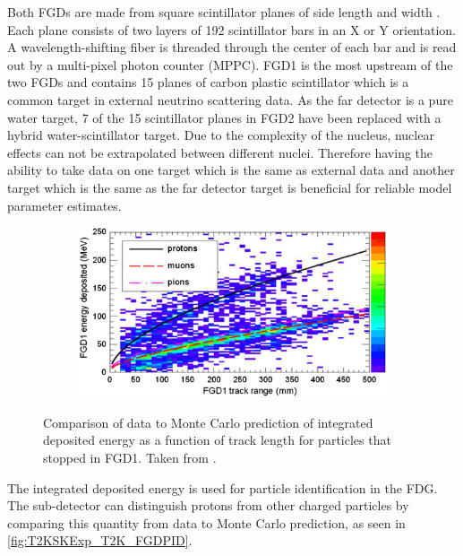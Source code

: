 Both FGDs are made from square scintillator planes of side length  and width . Each plane consists of two layers of 192 scintillator bars in an X or Y orientation. A wavelength-shifting fiber is threaded through the center of each bar and is read out by a multi-pixel photon counter (MPPC). FGD1 is the most upstream of the two FGDs and contains 15 planes of carbon plastic scintillator which is a common target in external neutrino scattering data. As the far detector is a pure water target, 7 of the 15 scintillator planes in FGD2 have been replaced with a hybrid water-scintillator target. Due to the complexity of the nucleus, nuclear effects can not be extrapolated between different nuclei. Therefore having the ability to take data on one target which is the same as external data and another target which is the same as the far detector target is beneficial for reliable model parameter estimates.

\begin{figure}[h]
  \begin{subfigure}[t]{0.7\textwidth}
    \includegraphics[width=\textwidth, trim={0mm 0mm 0mm 0mm}, clip,page=1]{Figures/Detectors/T2KFGDPID.pdf}
  \end{subfigure}
  \caption{Comparison of data to Monte Carlo prediction of integrated deposited energy as a function of track length for particles that stopped in FGD1. Taken from \cite{Amaudruz2012}.}
  \label{fig:T2KSKExp_T2K_FGDPID}
\end{figure}

The integrated deposited energy is used for particle identification in the FDG. The sub-detector can distinguish protons from other charged particles by comparing this quantity from data to Monte Carlo prediction, as seen in \autoref{fig:T2KSKExp_T2K_FGDPID}.

